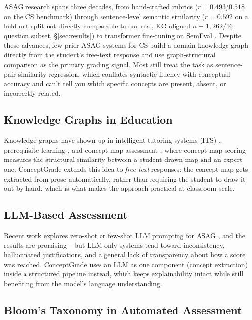 \documentclass[conference]{IEEEtran}
\begin{document}
ASAG research spans three decades, from hand-crafted rubrics
\cite{mohler2009,mohler2011} ($r=0.493$/$0.518$ on the CS benchmark)
through sentence-level semantic similarity \cite{sultan2016}
($r=0.592$ on a held-out split not directly comparable to our
real, KG-aligned $n=1{,}262$/46-question subset, \S\ref{sec:results})
to transformer fine-tuning on SemEval \cite{dzikovska2013,bert_asag}.
Despite these advances, few prior ASAG systems for CS build a domain
knowledge graph directly from the student's free-text response and
use graph-structural comparison as the primary grading signal. Most
still treat the task as sentence-pair similarity regression, which
conflates syntactic fluency with conceptual accuracy and can't tell
you which specific concepts are present, absent, or incorrectly
related.

\subsection{Knowledge Graphs in Education}

Knowledge graphs have shown up in intelligent tutoring systems (ITS)
\cite{kg_its}, prerequisite learning \cite{kg_prereq}, and concept map
assessment \cite{concept_map}, where concept-map scoring measures the
structural similarity between a student-drawn map and an expert one.
ConceptGrade extends this idea to \emph{free-text} responses: the
concept map gets extracted from prose automatically, rather than
requiring the student to draw it out by hand, which is what makes the
approach practical at classroom scale.

\subsection{LLM-Based Assessment}

Recent work explores zero-shot or few-shot LLM prompting for ASAG
\cite{llm_asag1,llm_asag2}, and the results are promising -- but
LLM-only systems tend toward inconsistency, hallucinated
justifications, and a general lack of transparency about how a score
was reached. ConceptGrade uses an LLM as one component (concept
extraction) inside a structured pipeline instead, which keeps
explainability intact while still benefiting from the model's language
understanding.

\subsection{Bloom's Taxonomy in Automated Assessment}
\end{document}
